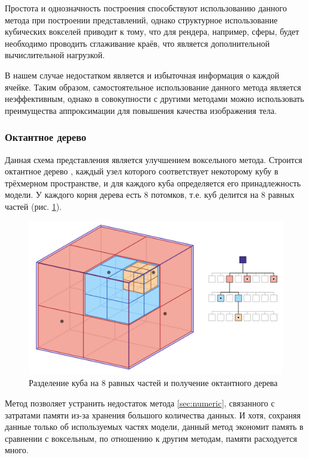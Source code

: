 Простота и однозначность построения способствуют использованию 
данного метода при построении представлений, однако структурное 
использование кубических вокселей приводит к тому, что для рендера, например, сферы, будет необходимо проводить сглаживание краёв, что 
является дополнительной вычислительной нагрузкой.

В нашем случае недостатком является и избыточная информация о 
каждой ячейке.
Таким образом, самостоятельное использование данного метода 
является неэффективным, однако в совокупности с другими методами можно 
использовать преимущества аппроксимации для повышения качества 
изображения тела.

\subsubsection{Октантное дерево}

Данная схема представления является улучшением воксельного метода. 
Строится октантное дерево \cite{numeric-octree}, каждый узел которого соответствует некоторому 
кубу в трёхмерном пространстве, и для каждого куба определяется его 
принадлежность модели.
У каждого корня дерева есть 8 потомков, т.е. куб 
делится на 8 равных частей (рис. \ref{fig:octTree}).
\newpage

\begin{figure}[h]
	\centering
	\captionsetup{justification=centering}
	\includegraphics[width=\textwidth]{img/octTree.png}
	\caption{Разделение куба на 8 равных частей и получение 
		октантного дерева}
	\label{fig:octTree}
\end{figure}

Метод позволяет устранить недостаток метода \ref{sec:numeric}, 
связанного с затратами памяти из-за хранения большого количества данных.
И хотя, сохраняя данные только об используемых частях модели, данный метод экономит память в сравнении с воксельным, по отношению к другим методам, 
памяти расходуется много.

